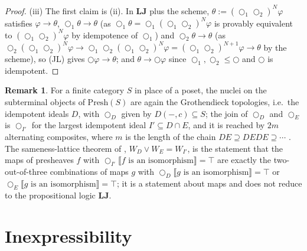 \documentclass[11pt]{amsart}
\theoremstyle{definition}
\newtheorem{rem}[thm]{Remark}
\newcommand{\LLJ}{\mathbf{LJ}}
\newcommand{\lax}{\bigcirc}
\newcommand{\laxa}{\bigcirc_1}
\newcommand{\laxb}{\bigcirc_2}
\newcommand{\Presh}{\mathrm{Presh}}
\begin{document}
\begin{proof}
(iii) The first claim is (ii). In $\LLJ$ plus the scheme, $\theta:=(\laxa\laxb)^N\varphi$
satisfies $\varphi\to\theta$, $\laxa\theta\to\theta$ (as $\laxa\theta=\laxa(\laxa\laxb)^N\varphi$
is provably equivalent to $(\laxa\laxb)^N\varphi$ by idempotence of $\laxa$) and
$\laxb\theta\to\theta$ (as $\laxb(\laxa\laxb)^N\varphi\to\laxa\laxb(\laxa\laxb)^N\varphi=(\laxa\laxb)^{N+1}\varphi\to\theta$
by the scheme), so (JL) gives $\lax\varphi\to\theta$; and $\theta\to\lax\varphi$
since $\laxa,\laxb\le\lax$ and $\lax$ is idempotent.
\end{proof}

\begin{rem}
For a finite category $S$ in place of a poset, the nuclei on the subterminal
objects of $\Presh(S)$ are again the Grothendieck topologies, i.e.\ the
idempotent ideals $D$, with $\lax_D$ given by $D(-,c)\subseteq S$; the join
of $\lax_D$ and $\lax_E$ is $\lax_{I'}$ for the largest idempotent ideal
$I'\subseteq D\cap E$, and it is reached by $2m$ alternating composites, where
$m$ is the length of the chain $DE\supseteq DEDE\supseteq\cdots$
\cite[\S2]{Finitejoin}. The sameness-lattice theorem of \cite{Finitejoin},
$W_D\vee W_E=W_{I'}$, is the statement that the maps of presheaves
$f$ with $\lax_{I'}\llbracket f\text{ is an isomorphism}\rrbracket=\top$ are
exactly the two-out-of-three combinations of maps $g$ with
$\lax_D\llbracket g\text{ is an isomorphism}\rrbracket=\top$ or
$\lax_E\llbracket g\text{ is an isomorphism}\rrbracket=\top$; it is a
statement about maps and does not reduce to the propositional logic $\LLJ$.
\end{rem}

\section{Inexpressibility}\label{sec:inexp}
\end{document}
